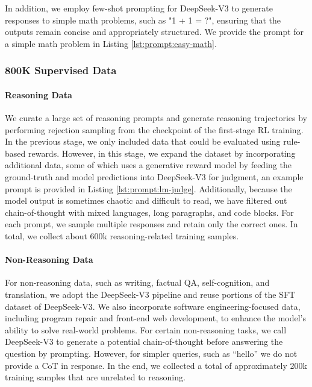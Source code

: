 

In addition, we employ few-shot prompting for DeepSeek-V3 to generate responses to simple math problems, such as "1 + 1 = ?", ensuring that the outputs remain concise and appropriately structured.  We provide the prompt for a simple math problem in Listing \ref{lst:prompt:easy-math}.






\subsubsection{800K Supervised Data} \label{sec:sft_data}
\paragraph{Reasoning Data} 
We curate a large set of reasoning prompts and generate reasoning trajectories by performing rejection sampling from the checkpoint of the first-stage RL training.
In the previous stage, we only included data that could be evaluated using rule-based rewards. However, in this stage, we expand the dataset by incorporating additional data, some of which uses a generative reward model by feeding the ground-truth and model predictions into DeepSeek-V3 for judgment, an example prompt is provided in Listing \ref{lst:prompt:lm-judge}.
Additionally, because the model output is sometimes chaotic and difficult to read, we have filtered out chain-of-thought with mixed languages, long paragraphs, and code blocks.
For each prompt, we sample multiple responses and retain only the correct ones. In total, we collect about 600k reasoning-related training samples. 


\paragraph{Non-Reasoning Data}
For non-reasoning data, such as writing, factual QA, self-cognition, and translation, we adopt the DeepSeek-V3 pipeline and reuse portions of the SFT dataset of DeepSeek-V3. We also incorporate software engineering-focused data, including program repair and front-end web development, to enhance the model's ability to solve real-world problems. For certain non-reasoning tasks, we call DeepSeek-V3 to generate a potential chain-of-thought before answering the question by prompting. However, for simpler queries, such as ``hello'' we do not provide a CoT in response.
In the end, we collected a total of approximately 200k training samples that are unrelated to reasoning.

